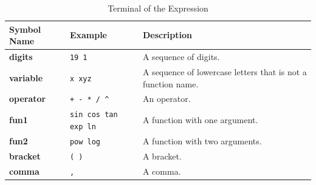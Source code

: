 \documentclass[a4paper,oneside]{book}
\begin{document}
\begin{table}[!ht]
    \centering
    \caption{Terminal of the Expression}\label{tab:terminals}
    \begin{tabular}{C{0.1\textwidth} C{0.2\textwidth}  p{0.6\textwidth}}
        \toprule
        Symbol Name       & Example                   & Description                                                  \\
        \midrule
        \textbf{digits}   & \verb|19 1|               & A sequence of digits.                                        \\
        \textbf{variable} & \verb|x xyz|              & A sequence of lowercase letters that is not a function name. \\
        \textbf{operator} & \verb|+ - * / ^|          & An operator.                                                 \\
        \textbf{fun1}     & \verb|sin cos tan exp ln| & A function with one argument.                                \\
        \textbf{fun2}     & \verb|pow log|            & A function with two arguments.                               \\
        \textbf{bracket}  & \verb|( )|                & A bracket.                                                   \\
        \textbf{comma}    & \verb|,|                  & A comma.                                                     \\
        \bottomrule
    \end{tabular}
\end{table}
\end{document}

